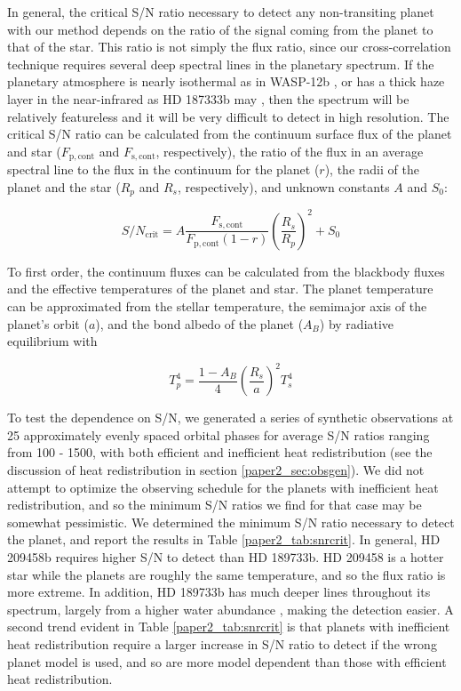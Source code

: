 In general, the critical S/N ratio necessary to detect any non-transiting planet with our method depends on the ratio of the signal coming from the planet to that of the star. This ratio is not simply the flux ratio, since our cross-correlation technique requires several deep spectral lines in the planetary spectrum. If the planetary atmosphere is nearly isothermal as in WASP-12b \citep{Crossfield2012}, or has a thick haze layer in the near-infrared as HD 187333b may \citep{Gibson2012}, then the spectrum will be relatively featureless and it will be very difficult to detect in high resolution.  The critical S/N ratio can be calculated from the continuum surface flux of the planet and star ($F_\mathrm{ p, cont}$ and $F_\mathrm{ s, cont}$, respectively), the ratio of the flux in an average spectral line to the flux in the continuum for the planet ($r$), the radii of the planet and the star ($R_p$ and $R_s$, respectively), and unknown constants $A$ and $S_0$:

\begin{equation}
S/N_\mathrm{ crit} = A \frac {F_\mathrm{ s, cont}}{F_\mathrm{ p, cont}(1 - r)} \left ( \frac{R_s}{R_p} \right )^2 + S_0
\label{paper2_eqn:snrcrit}
\end{equation}

To first order, the continuum fluxes can be calculated from the blackbody fluxes and the effective temperatures of the planet and star. The planet temperature can be approximated from the stellar temperature, the semimajor axis of the planet's orbit ($a$), and the bond albedo of the planet ($A_B$) by radiative equilibrium with

\begin{equation}
T_p^4 = \frac{1-A_B}{4} \left ( \frac{R_s}{a} \right )^2 T_s^4
\end{equation}

To test the dependence on S/N, we generated a series of synthetic observations at 25 approximately evenly spaced orbital phases for average S/N ratios ranging from 100  - 1500, with both efficient and inefficient heat redistribution (see the discussion of heat redistribution in section \ref{paper2_sec:obsgen}). We did not attempt to optimize the observing schedule for the planets with inefficient heat redistribution, and so the minimum S/N ratios we find for that case may be somewhat pessimistic. We determined the minimum S/N ratio necessary to detect the planet, and report the results in Table \ref{paper2_tab:snrcrit}. In general, HD 209458b requires higher S/N to detect than HD 189733b. HD 209458 is a hotter star while the planets are roughly the same temperature, and so the flux ratio is more extreme. In addition, HD 189733b has much deeper lines throughout its spectrum, largely from a higher water abundance \citep{Madhusudhan2009}, making the detection easier. A second trend evident in Table \ref{paper2_tab:snrcrit} is that planets with inefficient heat redistribution require a larger increase in S/N ratio to detect if the wrong planet model is used, and so are more model dependent than those with efficient heat redistribution.

